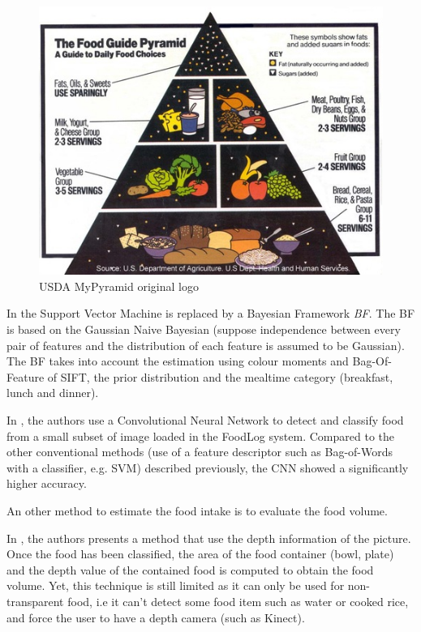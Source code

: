 \begin{figure}
    \centering
    \includegraphics[scale=0.7]{img/my_pyramid.jpg}
    \caption{USDA MyPyramid original logo}
    \label{fig:my_pyramid}
\end{figure}

In \cite{Aizawa2013} the Support Vector Machine is replaced by a Bayesian Framework \textit{BF}.
The BF is based on the Gaussian Naive Bayesian (suppose independence between every pair of features and the distribution of each feature is assumed to be Gaussian). The BF takes into account the estimation using colour moments and Bag-Of-Feature of SIFT, the prior distribution and the mealtime category (breakfast, lunch and dinner).

In \cite{Kagaya2014}, the authors use a Convolutional Neural Network  to detect and classify food from a small subset of image loaded in the FoodLog system. Compared to the other conventional methods (use of a feature descriptor such as Bag-of-Words with a classifier, e.g. SVM) described previously, the CNN showed a significantly higher accuracy.


An other method to estimate the food intake is to evaluate the food volume.

In \cite{Chen2012}, the authors presents a method that use the depth information of the picture. Once the food has been classified, the area of the food container (bowl, plate) and the depth value of the contained food is computed to obtain the food volume.
Yet, this technique is still limited as it can only be used for non-transparent food, i.e it can't detect some food item such as water or cooked rice, and force the user to have a depth camera (such as Kinect).

